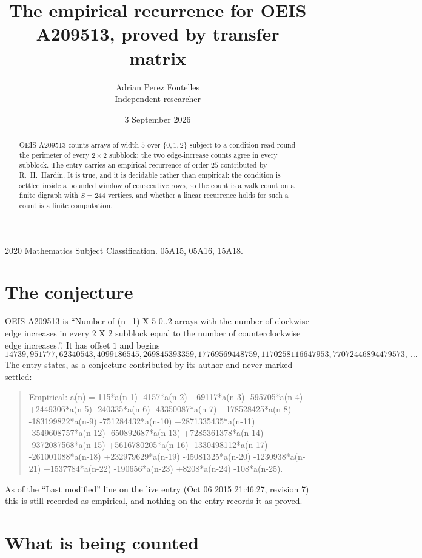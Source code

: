 \documentclass[11pt,a4paper]{article}
\title{The empirical recurrence for OEIS A209513, proved by transfer matrix}
\author{Adrian Perez Fontelles\\ \small Independent researcher}
\date{3 September 2026}
\theoremstyle{plain}
\theoremstyle{definition}
\begin{document}
\maketitle

\begin{abstract}
OEIS A209513 counts arrays of width $5$ over $\{0,1,2\}$ subject to a condition read round the
perimeter of every $2\times2$ subblock: the two edge-increase counts agree in every subblock. The entry carries an empirical recurrence of
order $25$ contributed by R.~H.~Hardin. It is true, and it is decidable rather than
empirical: the condition is settled inside a bounded window of consecutive rows, so the
count is a walk count on a finite digraph with $S=244$ vertices, and whether a linear
recurrence holds for such a count is a finite computation.
\end{abstract}

\noindent\small 2020 Mathematics Subject Classification. 05A15, 05A16, 15A18.\normalsize

\section{The conjecture}

OEIS A209513 is ``Number of (n+1) X 5 0..2 arrays with the number of clockwise edge increases in every 2 X 2 subblock equal to the number of counterclockwise edge increases.''. It has offset $1$ and begins
\[
14739, 951777, 62340543, 4099186545, 269845393359, 17769569448759, 1170258116647953, 77072446894479573,\ \dots
\]
The entry states, as a conjecture contributed by its author and never marked settled:
\begin{quote}
Empirical: a(n) = 115*a(n-1) -4157*a(n-2) +69117*a(n-3) -595705*a(n-4) +2449306*a(n-5) -240335*a(n-6) -43350087*a(n-7) +178528425*a(n-8) -183199822*a(n-9) -751284432*a(n-10) +2871335435*a(n-11) -3549608757*a(n-12) -650892687*a(n-13) +7285361378*a(n-14) -9372087568*a(n-15) +5616780205*a(n-16) -1330498112*a(n-17) -261001088*a(n-18) +232979629*a(n-19) -45081325*a(n-20) -1230938*a(n-21) +1537784*a(n-22) -190656*a(n-23) +8208*a(n-24) -108*a(n-25).
\end{quote}
As of the ``Last modified'' line on the live entry (Oct 06 2015 21:46:27, revision 7) this is still
recorded as empirical, and nothing on the entry records it as proved.

\section{What is being counted}
\end{document}
